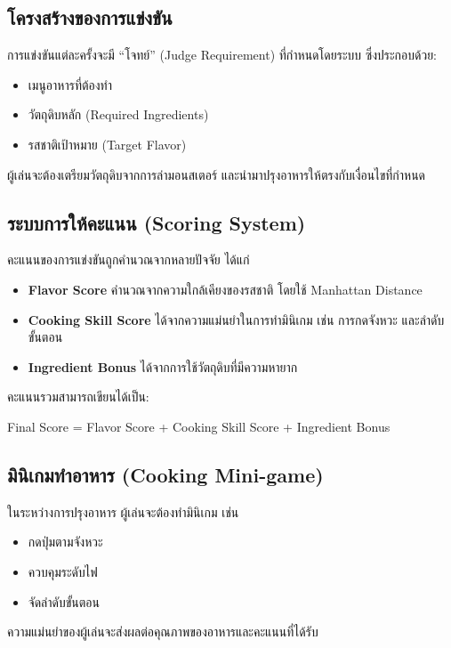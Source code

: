 \subsection{โครงสร้างของการแข่งขัน}

การแข่งขันแต่ละครั้งจะมี “โจทย์” (Judge Requirement) ที่กำหนดโดยระบบ ซึ่งประกอบด้วย:

\begin{itemize}
\item เมนูอาหารที่ต้องทำ
\item วัตถุดิบหลัก (Required Ingredients)
\item รสชาติเป้าหมาย (Target Flavor)
\end{itemize}

ผู้เล่นจะต้องเตรียมวัตถุดิบจากการล่ามอนสเตอร์ และนำมาปรุงอาหารให้ตรงกับเงื่อนไขที่กำหนด

\subsection{ระบบการให้คะแนน (Scoring System)}

คะแนนของการแข่งขันถูกคำนวณจากหลายปัจจัย ได้แก่

\begin{itemize}
\item \textbf{Flavor Score}  
คำนวณจากความใกล้เคียงของรสชาติ โดยใช้ Manhattan Distance

\item \textbf{Cooking Skill Score}  
ได้จากความแม่นยำในการทำมินิเกม เช่น การกดจังหวะ และลำดับขั้นตอน

\item \textbf{Ingredient Bonus}  
ได้จากการใช้วัตถุดิบที่มีความหายาก
\end{itemize}

คะแนนรวมสามารถเขียนได้เป็น:
\par
Final Score = Flavor Score + Cooking Skill Score + Ingredient Bonus

\subsection{มินิเกมทำอาหาร (Cooking Mini-game)}

ในระหว่างการปรุงอาหาร ผู้เล่นจะต้องทำมินิเกม เช่น
\begin{itemize}
\item กดปุ่มตามจังหวะ
\item ควบคุมระดับไฟ
\item จัดลำดับขั้นตอน
\end{itemize}
ความแม่นยำของผู้เล่นจะส่งผลต่อคุณภาพของอาหารและคะแนนที่ได้รับ

